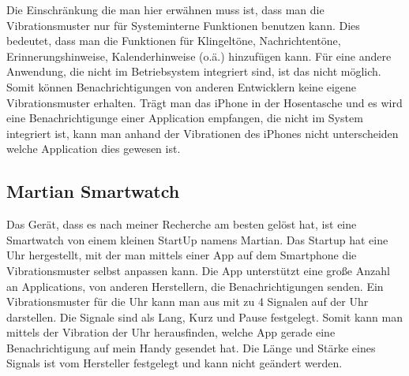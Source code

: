 Die Einschr{\"a}nkung die man hier erwähnen muss ist, dass man die Vibrationsmuster nur f{\"u}r Systeminterne Funktionen benutzen kann. 
Dies bedeutet, dass man die Funktionen f{\"u}r Klingelt{\"o}ne, Nachrichtent{\"o}ne, Erinnerungshinweise, Kalenderhinweise (o.{\"a}.) hinzuf{\"u}gen kann. 
F{\"u}r eine andere Anwendung, die nicht im Betriebsystem integriert sind, ist das nicht m{\"o}glich. 
Somit k{\"o}nnen Benachrichtigungen von anderen Entwicklern keine eigene Vibrationsmuster erhalten. 
Trägt man das iPhone in der Hosentasche und es wird eine Benachrichtigunge einer Application empfangen, die nicht im System integriert ist, kann man anhand der Vibrationen des iPhones nicht unterscheiden welche Application dies gewesen ist.

\subsection{Martian Smartwatch}
\label{ch:Grundlagen:sec:RelatedWork:subsec:PersonalisierteSmartwatch}


Das Ger{\"a}t, dass es nach meiner Recherche am besten gel{\"o}st hat, ist eine Smartwatch von einem kleinen StartUp namens Martian. 
Das Startup hat eine Uhr hergestellt, mit der man mittels einer App auf dem Smartphone die Vibrationsmuster selbst anpassen kann. 
Die App unterst{\"u}tzt eine gro{\ss}e Anzahl an Applications, von anderen Herstellern, die Benachrichtigungen senden. 
Ein Vibrationsmuster f{\"u}r die Uhr kann man aus mit zu 4 Signalen auf der Uhr darstellen. 
Die Signale sind als Lang, Kurz und Pause festgelegt. 
Somit kann man mittels der Vibration der Uhr herausfinden, welche App gerade eine Benachrichtigung auf mein Handy gesendet hat. 
Die L{\"a}nge und St{\"a}rke eines Signals ist vom Hersteller festgelegt und kann nicht geändert werden.

